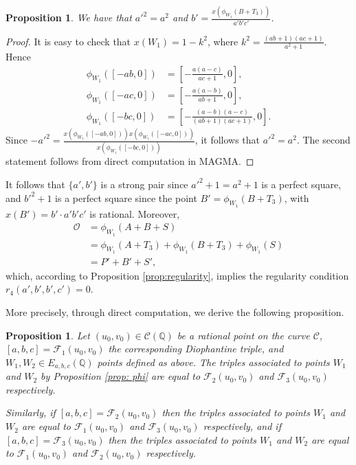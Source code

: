 \documentclass[a4paper]{amsart}
\theoremstyle{plain}
\newtheorem{proposition}[theorem]{Proposition}
\def\Q{\mathbb{Q}}
\theoremstyle{definition}
\begin{document}
\begin{proposition} We have that $a'^2=a^2$ and $b'=\frac{x(\phi_{W_1}(B+T_3))}{a'b'c'}$.
\end{proposition}
\begin{proof}
It is easy to check that $x(W_1)=1-k^2$, where $k^2=\frac{(ab+1)(ac+1)}{a^2+1}$. Hence
\[
\begin{aligned}
	\phi_{W_1}([-ab,0]) &= \left[ -\frac{a (a-c)}{a c+1}, 0 \right], \\
	\phi_{W_1}([-ac,0]) &= \left[ -\frac{a (a-b)}{a b+1}, 0 \right], \\
	\phi_{W_1}([-bc,0]) &= \left[ -\frac{(a-b) (a-c)}{(a b+1) (a c+1)}, 0 \right].
\end{aligned}
\]
Since $-a'^2=\frac{x(\phi_{W_1}([-ab,0]))x(\phi_{W_1}([-ac,0]))}{x(\phi_{W_1}([-bc,0]))}$, it follows that $a'^2=a^2$.
The second statement follows from direct computation in MAGMA.

\end{proof}

It follows that $\{a',b'\}$ is a strong pair since $a'^2+1=a^2+1$ is a perfect square, and $b'^2+1$ is a perfect square since the point $B'= \phi_{W_1}(B+T_3)$, with $x(B')=b'\cdot a'b'c'$ is rational. Moreover,
\begin{align*}
	\mathcal{O} &= \phi_{W_1}(A+B+S) \\
	&= \phi_{W_1}(A+T_3) + \phi_{W_1}(B+T_3) + \phi_{W_1}(S) \\
	&= P' + B' + S',
\end{align*}
which, according to Proposition \ref{prop:regularity}, implies the regularity condition $r_4(a',b',b',c')=0$.

More precisely, through direct computation, we derive the following proposition.

\begin{proposition}
	Let $(u_0,v_0)\in \mathcal{C}(\Q)$ be a rational point on the curve $\mathcal{C}$, $[a,b,c]=\mathcal{F}_1(u_0,v_0)$ the corresponding Diophantine triple, and $W_1,W_2\in E_{a,b,c}(\Q)$ points defined as above. The triples associated to points $W_1$ and $W_2$ by Proposition \ref{prop: phi} are equal to $\mathcal{F}_2(u_0,v_0)$ and  $\mathcal{F}_3(u_0,v_0)$ respectively. 
	
	Similarly, if $[a,b,c]=\mathcal{F}_2(u_0,v_0)$  then the triples associated to points $W_1$ and $W_2$ are equal to $\mathcal{F}_1(u_0,v_0)$ and  $\mathcal{F}_3(u_0,v_0)$ respectively, and if  $[a,b,c]=\mathcal{F}_3(u_0,v_0)$  then the triples associated to points $W_1$ and $W_2$ are equal to $\mathcal{F}_1(u_0,v_0)$ and  $\mathcal{F}_2(u_0,v_0)$ respectively. 
\end{proposition}
\end{document}
